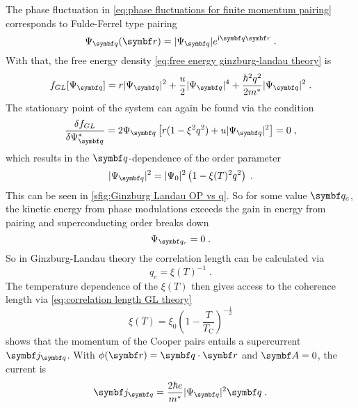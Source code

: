 \documentclass[../main.tex]{subfiles}
\begin{document}
The phase fluctuation in \cref{eq:phase fluctuations for finite momentum pairing} corresponds to Fulde-Ferrel type pairing \cite{kinnunenFuldeFerrellLarkin2018}
\begin{equation}
	\Psi_{\vb{q}} (\vb{r}) = \vert \Psi_{\vb{q}} \vert e^{\iu \vb{q} \vb{r}} \;.
\end{equation}
With that, the free energy density \cref{eq:free energy ginzburg-landau theory} is
\begin{equation}
	f_{GL} [\Psi_{\vb{q}}] = r \vert \Psi_{\vb{q}} \vert^2 + \frac{u}{2} \vert \Psi_{\vb{q}} \vert^4 + \frac{\hbar^2 q^2}{2 m^*} \vert \Psi_{\vb{q}} \vert^2 \;.
\end{equation}
The stationary point of the system can again be found via the condition
\begin{equation}
	\fdv{f_{GL}}{\Psi_{\vb{q}}^*} = 2 \Psi_{\vb{q}} \left[r (1 - \xi^2 q^2) + u \vert \Psi_{\vb{q}} \vert^2\right] = 0 \;,
\end{equation}
which results in the \(\vb{q}\)-dependence of the order parameter
\begin{equation}
	\vert \Psi_{\vb{q}} \vert^2 = \vert \Psi_{0} \vert^2 \left(1 - \xi(T)^2 q^2\right) \;.
\end{equation}
This can be seen in \cref{sfig:Ginzburg Landau OP vs q}.
So for some value \(\vb{q}_c\), the kinetic energy from phase modulations exceeds the gain in energy from pairing and superconducting order breaks down
\begin{equation}
	\Psi_{\vb{q}_c} = 0 \;.
\end{equation}
So in Ginzburg-Landau theory the correlation length can be calculated via
\begin{equation}
	q_c = \xi(T)^{-1} \;.
\end{equation}
The temperature dependence of the \(\xi(T)\) then gives access to the coherence length via \cref{eq:correlation length GL theory}
\begin{equation}
	\xi(T) = \xi_0 \left(1 - \frac{T}{T_{\mathrm{C}}}\right)^{-\frac{1}{2}}
\end{equation}
 shows that the momentum of the Cooper pairs entails a supercurrent \(\vb{j}_{\vb{q}}\).
With \(\phi(\vb{r}) = \vb{q} \cdot \vb{r}\) and \(\vb{A} = 0\), the current is
\begin{equation}
	\vb{j}_{\vb{q}} = \frac{2 \hbar e}{m^*} \vert \Psi_{\vb{q}} \vert^2 \vb{q} \;.
\end{equation}
\end{document}
